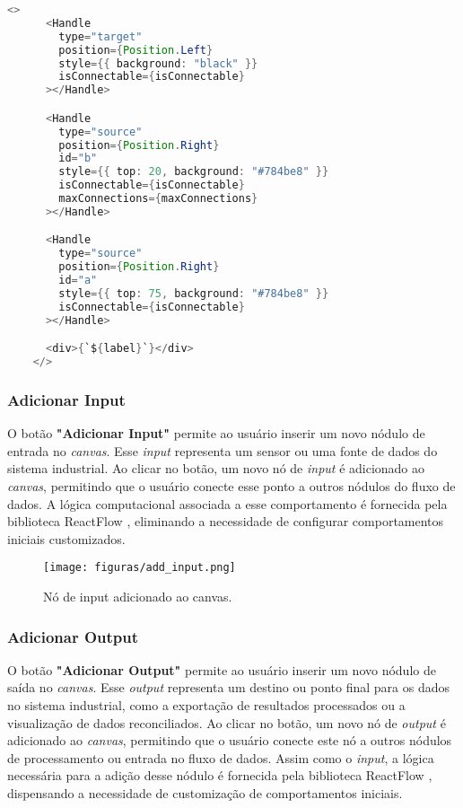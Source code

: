 \begin{lstlisting}[language=Java, caption=Nódulo customizado de exemplo]
    <>
      <Handle
        type="target"
        position={Position.Left}
        style={{ background: "black" }}
        isConnectable={isConnectable}
      ></Handle>

      <Handle
        type="source"
        position={Position.Right}
        id="b"
        style={{ top: 20, background: "#784be8" }}
        isConnectable={isConnectable}
        maxConnections={maxConnections}
      ></Handle>

      <Handle
        type="source"
        position={Position.Right}
        id="a"
        style={{ top: 75, background: "#784be8" }}
        isConnectable={isConnectable}
      ></Handle>

      <div>{`${label}`}</div>
    </>
\end{lstlisting}

\subsubsection{Adicionar Input}

O botão \textbf{"Adicionar Input"} permite ao usuário inserir um novo nódulo de entrada no \textit{canvas}. Esse \textit{input} representa um sensor ou uma fonte de dados do sistema industrial. Ao clicar no botão, um novo nó de \textit{input} é adicionado ao \textit{canvas}, permitindo que o usuário conecte esse ponto a outros nódulos do fluxo de dados. A lógica computacional associada a esse comportamento é fornecida pela biblioteca ReactFlow \cite{reactflow}, eliminando a necessidade de configurar comportamentos iniciais customizados.

\begin{figure}[htbp]
    \centering
    \texttt{[image: figuras/add\_input.png]}
    \caption{Nó de input adicionado ao canvas.}
    \label{Fig:AddInput}
\end{figure}

\subsubsection{Adicionar Output}

O botão \textbf{"Adicionar Output"} permite ao usuário inserir um novo nódulo de saída no \textit{canvas}. Esse \textit{output} representa um destino ou ponto final para os dados no sistema industrial, como a exportação de resultados processados ou a visualização de dados reconciliados. Ao clicar no botão, um novo nó de \textit{output} é adicionado ao \textit{canvas}, permitindo que o usuário conecte este nó a outros nódulos de processamento ou entrada no fluxo de dados. Assim como o \textit{input}, a lógica necessária para a adição desse nódulo é fornecida pela biblioteca ReactFlow \cite{reactflow}, dispensando a necessidade de customização de comportamentos iniciais.

